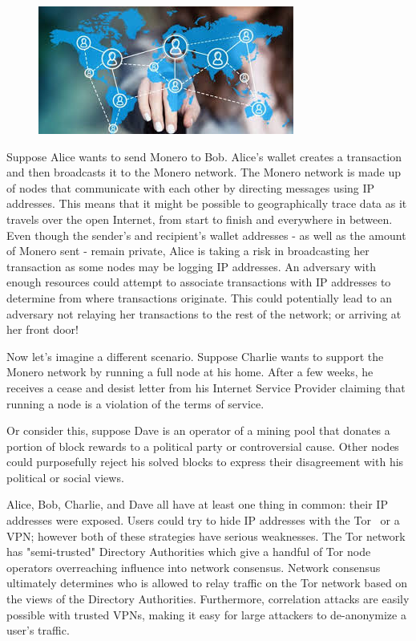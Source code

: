 \begin{figure}
\centering
\includegraphics[height=0.15\textwidth]{Images/Kovri/trace.jpg}
\end{figure}
Suppose Alice wants to send Monero to Bob. Alice's wallet creates a transaction and then broadcasts it to the Monero network. The Monero network is made up of nodes that communicate with each other by directing messages using IP addresses. This means that it might be possible to geographically trace data as it travels over the open Internet, from start to finish and everywhere in between. Even though the sender's and recipient's wallet addresses - as well as the amount of Monero sent - remain private, Alice is taking a risk in broadcasting her transaction as some nodes may be logging IP addresses. An adversary with enough resources could attempt to associate transactions with IP addresses to determine from where transactions originate. This could potentially lead to an adversary not relaying her transactions to the rest of the network; or arriving at her front door!

Now let’s imagine a different scenario. Suppose Charlie wants to support the Monero network by running a full node at his home. After a few weeks, he receives a cease and desist letter from his Internet Service Provider claiming that running a node is a violation of the terms of service.

Or consider this, suppose Dave is an operator of a mining pool that donates a portion of block rewards to a political party or controversial cause. Other nodes could purposefully reject his solved blocks to express their disagreement with his political or social views.
\pagebreak

Alice, Bob, Charlie, and Dave all have at least one thing in common: their IP addresses were exposed. Users could try to hide IP addresses with the Tor~\cite{tor} or a VPN; however both of these strategies have serious weaknesses. The Tor network has "semi-trusted" Directory Authorities which give a handful of Tor node operators overreaching influence into network consensus. Network consensus ultimately determines who is allowed to relay traffic on the Tor network based on the views of the Directory Authorities. Furthermore, correlation attacks are easily possible with trusted VPNs, making it easy for large attackers to de-anonymize a user's traffic.

